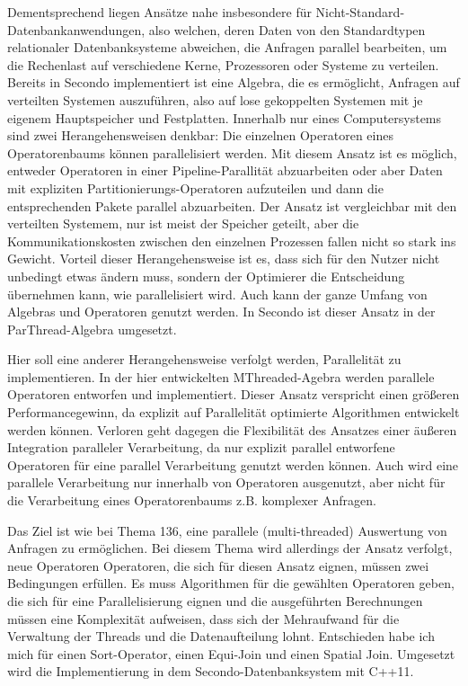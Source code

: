 \documentclass[a4paper,12pt,twoside]{article}
\begin{document}
Dementsprechend liegen Ansätze nahe insbesondere für Nicht-Standard-Datenbankanwendungen, also welchen, deren Daten von den Standardtypen relationaler Datenbanksysteme abweichen, die Anfragen parallel bearbeiten, um die Rechenlast auf verschiedene Kerne, Prozessoren oder Systeme zu verteilen. Bereits in Secondo implementiert ist eine Algebra, die es ermöglicht, Anfragen auf verteilten Systemen auszuführen, also auf lose gekoppelten Systemen mit je eigenem Hauptspeicher und Festplatten. Innerhalb nur eines Computersystems sind zwei Herangehensweisen denkbar: Die einzelnen Operatoren eines Operatorenbaums können parallelisiert werden. Mit diesem Ansatz ist es möglich, entweder Operatoren in einer Pipeline-Parallität abzuarbeiten oder aber Daten mit expliziten Partitionierungs-Operatoren aufzuteilen und dann die entsprechenden Pakete parallel abzuarbeiten. Der Ansatz ist vergleichbar mit den verteilten Systemem, nur ist meist der Speicher geteilt, aber die Kommunikationskosten zwischen den einzelnen Prozessen fallen nicht so stark ins Gewicht. Vorteil dieser Herangehensweise ist es, dass sich für den Nutzer nicht unbedingt etwas ändern muss, sondern der Optimierer die Entscheidung übernehmen kann, wie parallelisiert wird. Auch kann der ganze Umfang von Algebras und Operatoren genutzt werden. In Secondo ist dieser Ansatz in der ParThread-Algebra umgesetzt.
  
Hier soll eine anderer Herangehensweise verfolgt werden, Parallelität zu implementieren. In der hier entwickelten MThreaded-Agebra werden parallele Operatoren entworfen und implementiert. Dieser Ansatz verspricht einen größeren Performancegewinn, da explizit auf Parallelität optimierte Algorithmen entwickelt werden können. Verloren geht dagegen die Flexibilität des Ansatzes einer äußeren Integration paralleler Verarbeitung, da nur explizit parallel entworfene Operatoren für eine parallel Verarbeitung genutzt werden können. Auch wird eine parallele Verarbeitung nur innerhalb von Operatoren ausgenutzt, aber nicht für die Verarbeitung eines Operatorenbaums z.B. komplexer Anfragen.  

Das Ziel ist wie bei Thema 136, eine parallele (multi-threaded) Auswertung von Anfragen
zu ermöglichen. Bei diesem Thema wird allerdings der Ansatz verfolgt, neue Operatoren
Operatoren, die sich für diesen Ansatz eignen, müssen zwei Bedingungen erfüllen. Es muss Algorithmen für die gewählten Operatoren geben, die sich für eine Parallelisierung eignen und die ausgeführten Berechnungen müssen eine Komplexität aufweisen, dass sich der Mehraufwand für die Verwaltung der Threads und die Datenaufteilung lohnt. Entschieden habe ich mich für einen Sort-Operator, einen Equi-Join und einen Spatial Join. Umgesetzt wird die Implementierung in dem Secondo-Datenbanksystem mit C++11. 
\end{document}
